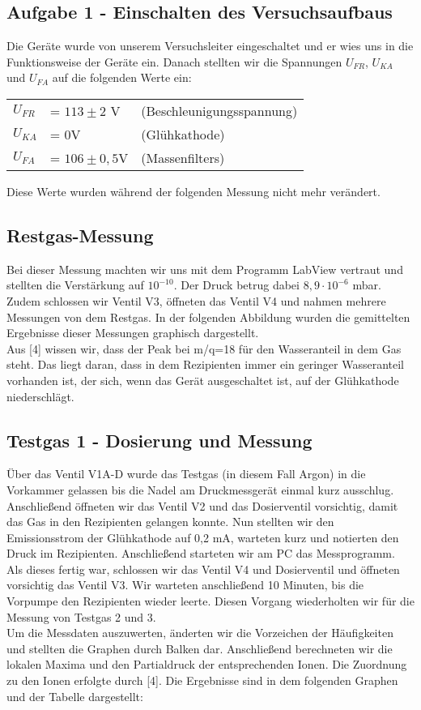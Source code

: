 \subsection{Aufgabe 1 - Einschalten des Versuchsaufbaus}
Die Geräte wurde von unserem Versuchsleiter eingeschaltet und er wies uns in die Funktionsweise der Geräte ein. Danach stellten wir die Spannungen $U_{FR}$, $U_{KA}$ und $U_{FA}$ auf die folgenden Werte ein:

\begin{tabular}{l|l|l}
$U_{FR}$ & = $113\pm 2$ V & (Beschleunigungsspannung)\\
$U_{KA}$ & = 0V & (Glühkathode)\\
$U_{FA}$ & = $106\pm 0,5$V & (Massenfilters)\\
\end{tabular}

Diese Werte wurden während der folgenden Messung nicht mehr verändert. 

\subsection{Restgas-Messung}
Bei dieser Messung machten wir uns mit dem Programm LabView vertraut und stellten die Verstärkung auf $10^{-10}$. Der Druck betrug dabei $8,9 \cdot 10^{-6}$ mbar. Zudem schlossen wir Ventil V3, öffneten das Ventil V4 und nahmen mehrere Messungen von dem Restgas. In der folgenden Abbildung wurden die gemittelten Ergebnisse dieser Messungen graphisch dargestellt.\\
Aus [4] wissen wir, dass der Peak bei m/q=18 für den Wasseranteil in dem Gas steht. Das liegt daran, dass in dem Rezipienten immer ein geringer Wasseranteil vorhanden ist, der sich, wenn das Gerät ausgeschaltet ist, auf der Glühkathode niederschlägt.


\newpage
\subsection{Testgas 1 - Dosierung und Messung}
Über das Ventil V1A-D wurde das Testgas (in diesem Fall Argon) in die Vorkammer gelassen bis die Nadel am Druckmessgerät einmal kurz ausschlug. Anschließend öffneten wir das Ventil V2 und das Dosierventil vorsichtig, damit das Gas in den Rezipienten gelangen konnte. Nun stellten wir den Emissionsstrom der Glühkathode auf 0,2 mA, warteten kurz und notierten den Druck im Rezipienten. Anschließend starteten wir am PC das Messprogramm. Als dieses fertig war, schlossen wir das Ventil V4 und Dosierventil und öffneten vorsichtig das Ventil V3. Wir warteten anschließend 10 Minuten, bis die Vorpumpe den Rezipienten wieder leerte. Diesen Vorgang wiederholten wir für die Messung von Testgas 2 und 3.\\
Um die Messdaten auszuwerten, änderten wir die Vorzeichen der Häufigkeiten und stellten die Graphen durch Balken dar. Anschließend berechneten wir die lokalen Maxima und den Partialdruck der entsprechenden Ionen. Die Zuordnung zu den Ionen erfolgte durch [4]. Die Ergebnisse sind in dem folgenden Graphen und der Tabelle dargestellt:\\

